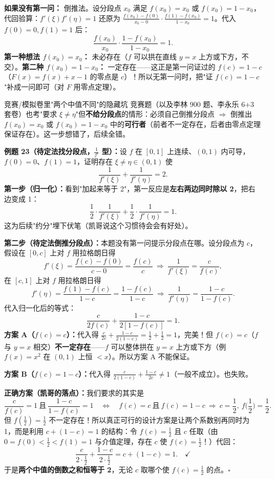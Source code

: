 \documentclass[a4paper]{article}
\begin{document}
\textbf{如果没有第一问：} 倒推法。设分段点 $x_0$ 满足 $f(x_0)=x_0$ 或 $f(x_0)=1-x_0$，代回验算：$f'(\xi)f'(\eta)=1$ 还原为 $\frac{f(x_0)-f(0)}{x_0-0}\cdot\frac{f(1)-f(x_0)}{1-x_0}=1$。代入 $f(0)=0,f(1)=1$ 后：
\[
\frac{f(x_0)}{x_0}\cdot\frac{1-f(x_0)}{1-x_0}=1 .
\]
\textbf{第一种想法 $f(x_0)=x_0$：} 未必存在（$f$ 可以拱在直线 $y=x$ 上方或下方，不交）。\textbf{第二种 $f(x_0)=1-x_0$：} 一定存在——这正是第一问证过的 $f(c)=1-c$（$F(x)=f(x)+x-1$ 的零点是 $c$）！所以无第一问时，把"证 $f(c)=1-c$"补成一问即可（对 $F$ 用零点定理）。

\begin{warningbox}{竞赛/模拟卷里"两个中值不同"的隐藏坑}
竞赛题（以及李林 900 题、李永乐 6+3 套卷）也考"要求 $\xi\neq\eta$"但\textbf{不给分段点}的情形：必须自己倒推分段点 $\Rightarrow$ 倒推出 $f(x_0)=x_0$ 或 $f(x_0)=1-x_0$ 中的\textbf{可行者}（前者不一定存在，后者由零点定理保证存在）。这一步想错了，后续全错。
\end{warningbox}

\textbf{例题 23（待定法找分段点，$\frac1{f'}$ 型）：}设 $f$ 在 $[0,1]$ 上连续、$(0,1)$ 内可导，$f(0)=0$、$f(1)=1$，证明存在 $\xi\neq\eta\in(0,1)$ 使
\[
\frac{1}{f'(\xi)}+\frac{1}{f'(\eta)}=2 .
\]
\textbf{第一步（归一化）：}看到"加起来等于 2"，第一反应是\textbf{左右两边同时除以 2}，把右边变成 1：
\[
\frac12\cdot\frac{1}{f'(\xi)}+\frac12\cdot\frac{1}{f'(\eta)}=1 .
\]
这为后续"约分"埋下伏笔（凯哥说这个习惯待会会有好处）。

\textbf{第二步（待定法倒推分段点）：}本题没有第一问提示分段点在哪。设分段点为 $c$，假设在 $[0,c]$ 上对 $f$ 用拉格朗日得
\[
f'(\xi)=\frac{f(c)-f(0)}{c-0}=\frac{f(c)}{c}\ \Rightarrow\ \frac{1}{f'(\xi)}=\frac{c}{f(c)},
\]
在 $[c,1]$ 上对 $f$ 用拉格朗日得
\[
f'(\eta)=\frac{f(1)-f(c)}{1-c}=\frac{1-f(c)}{1-c}\ \Rightarrow\ \frac{1}{f'(\eta)}=\frac{1-c}{1-f(c)}.
\]
代入归一化后的等式：
\[
\frac{c}{2f(c)}+\frac{1-c}{2[1-f(c)]}=1 .
\]
\textbf{方案 A（$f(c)=c$）：}代入得 $\frac{c}{2c}+\frac{1-c}{2(1-c)}=\frac12+\frac12=1$，完美！但 $f(c)=c$（$f$ 与 $y=x$ 相交）\textbf{不一定存在}——$f$ 可以整体拱在 $y=x$ 上方或下方（例 $f(x)=x^2$ 在 $(0,1)$ 上恒 $<x$）。所以方案 A 不能保证。

\textbf{方案 B（$f(c)=1-c$）：}代入得 $\frac{c}{2(1-c)}+\frac{1-c}{2c}\neq1$（一般不成立）。也失败。

\textbf{正确方案（凯哥的落点）：}我们要求的其实是
\[
\frac{c}{f(c)}=1\ \text{且}\ \frac{1-c}{1-f(c)}=1\quad\Longleftrightarrow\quad f(c)=c\ \text{且}\ f(c)=1-c\ \Rightarrow\ c=\frac12,\ f\Big(\frac12\Big)=\frac12.
\]
但 $f(\frac12)=\frac12$ 不一定存在！所以真正可行的设计方案是让两个系数别再同时为 1，而是利用 $c+(1-c)=1$ 的结构：令 $f(c)=\frac12$ 且 $c$ 任取（由 $0=f(0)<\frac12<f(1)=1$ 与介值定理，存在 $c$ 使 $f(c)=\frac12$！）代回：
\[
\frac{c}{2\cdot\frac12}+\frac{1-c}{2\cdot\frac12}=c+(1-c)=1 .\quad\checkmark
\]
于是\textbf{两个中值的倒数之和恒等于 2}，无论 $c$ 取哪个使 $f(c)=\frac12$ 的点。$\square$
\end{document}
